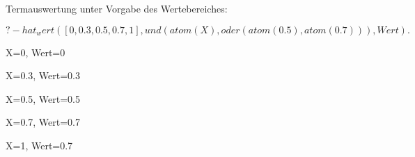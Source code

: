 \documentclass[a4paper]{article}
\begin{document}
\begin{multicols}{3}
  Termauswertung unter Vorgabe des Wertebereiches:
  \begin{itemize*}
    \item $?- hat_wert([0,0.3, 0.5, 0.7, 1], und(atom(X),oder(atom(0.5),atom(0.7))),Wert).$
    \item X=0, Wert=0
    \item X=0.3, Wert=0.3
    \item X=0.5, Wert=0.5
    \item X=0.7, Wert=0.7
    \item X=1, Wert=0.7
  \end{itemize*}

\end{multicols}
\end{document}
